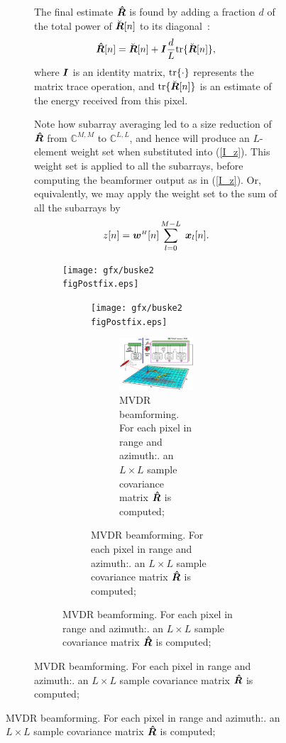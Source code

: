 \begin{figure}[htbp]
\begin{figure}[htbp]
The final estimate $\boldsymbol{\hat R}$ is found by adding a fraction $d$ of the total power of $\breve{\boldsymbol{R}}[n]$ to its diagonal~\cite{Synnevag2007}:
\begin{align}
\eR[n] = \breve{\R}[n] + \I \frac{d}{L} \tr\{\breve{\R}[n]\},\label{I_finalR}
\end{align}
where $\boldsymbol{I}$ is an identity matrix, $\text{tr}\{\cdot\}$ represents the matrix trace operation, and $\text{tr}\{\breve{\boldsymbol{R}}[n]\}$ is an estimate of the energy received from this pixel.

Note how subarray averaging led to a size reduction of $\boldsymbol{\hat R}$ from $\mathbb{C}^{M,M}$ to $\mathbb{C}^{L,L}$, and hence will produce an $L$-element weight set when substituted into (\ref{I_z}). This weight set is applied to all the subarrays, before computing the beamformer output as in (\ref{I_z}). Or, equivalently, we may apply the weight set to the sum of all the subarrays by
%
\begin{align}
z[n] = \w\H[n] \sumb{l=0}{M-L} \x_l[n].\label{I_finalZ}
\end{align}
%
\ifPhdDoc
\begin{figure}[tbp]\centering
\texttt{[image: gfx/buske2\\figPostfix.eps]}
\else
\ifPeerReview
\begin{figure}[!t]\centering
\texttt{[image: gfx/buske2\\figPostfix.eps]}
\else
\begin{figure}[!t]\centering
\includegraphics[width=\linewidth]{gfx/implementation.eps}
\fi\fi%
\caption{MVDR beamforming. For each pixel in range and azimuth:. an $L\times{}L$ sample covariance matrix $\boldsymbol{\hat R}$ is computed; \newline
}
\end{figure}
\end{figure}
\end{figure}
\end{figure}
\end{figure}
